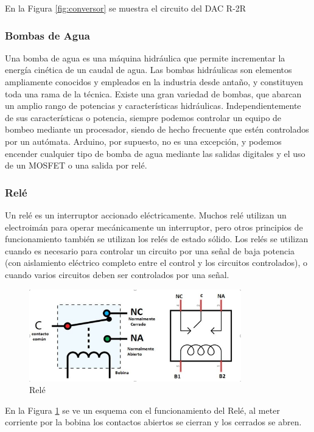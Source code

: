 \documentclass[a4paper]{article}
\begin{document}
En la Figura \ref{fig:conversor} se muestra el circuito del DAC R-2R


\subsubsection*{Bombas de Agua}

Una bomba de agua es una máquina hidráulica que permite incrementar la energía cinética de un caudal de agua.
Las bombas hidráulicas son elementos ampliamente conocidos y empleados en la industria desde antaño, y constituyen toda una rama de la técnica. Existe una gran variedad de bombas, que abarcan un amplio rango de potencias y características hidráulicas.
Independientemente de sus características o potencia, siempre podemos controlar un equipo de bombeo mediante un procesador, siendo de hecho frecuente que estén controlados por un autómata. Arduino, por supuesto, no es una excepción, y podemos encender cualquier tipo de bomba de agua mediante las salidas digitales y el uso de un MOSFET o una salida por relé.

\subsubsection*{Relé}

Un relé es un interruptor accionado eléctricamente. Muchos relé utilizan un electroimán para operar mecánicamente un interruptor, pero otros principios de funcionamiento también se utilizan los relés de estado sólido. Los relés se utilizan cuando es necesario para controlar un circuito por una señal de baja potencia (con aislamiento eléctrico completo entre el control y los circuitos controlados), o cuando varios circuitos deben ser controlados por una señal.


\begin{figure}[h]\centering
    \includegraphics[height=4cm]{rele.png}
    \caption{Relé}
    \label{fig:Rele}
\end{figure}

En la Figura \ref{fig:Rele} se ve un esquema con el funcionamiento del Relé, al meter corriente por la bobina los contactos abiertos se cierran y los cerrados se abren.
\end{document}

